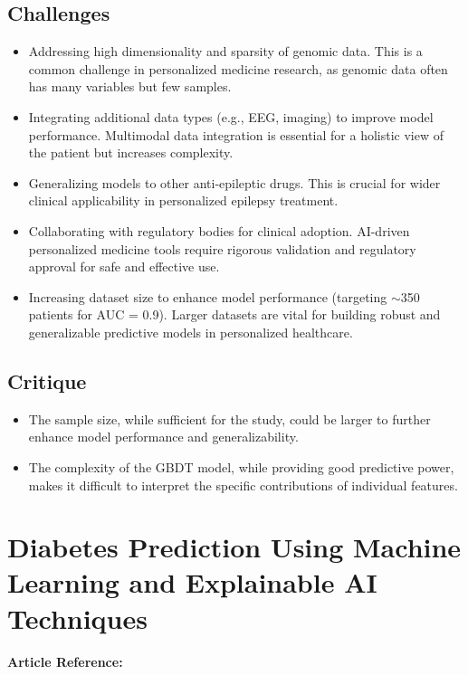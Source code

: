 \subsection*{Challenges}
\begin{itemize}
    \item Addressing high dimensionality and sparsity of genomic data. This is a common challenge in personalized medicine research, as genomic data often has many variables but few samples.
    \item Integrating additional data types (e.g., EEG, imaging) to improve model performance. Multimodal data integration is essential for a holistic view of the patient but increases complexity.
    \item Generalizing models to other anti-epileptic drugs. This is crucial for wider clinical applicability in personalized epilepsy treatment.
    \item Collaborating with regulatory bodies for clinical adoption. AI-driven personalized medicine tools require rigorous validation and regulatory approval for safe and effective use.
    \item Increasing dataset size to enhance model performance (targeting $\sim$350 patients for AUC = 0.9). Larger datasets are vital for building robust and generalizable predictive models in personalized healthcare.
\end{itemize}

\subsection*{Critique}
\begin{itemize}
    \item The sample size, while sufficient for the study, could be larger to further enhance model performance and generalizability. 
    \item The complexity of the GBDT model, while providing good predictive power, makes it difficult to interpret the specific contributions of individual features.
    
\end{itemize}

\section{Diabetes Prediction Using Machine Learning and Explainable AI Techniques}
\textbf{Article Reference:} \cite{article_2}

